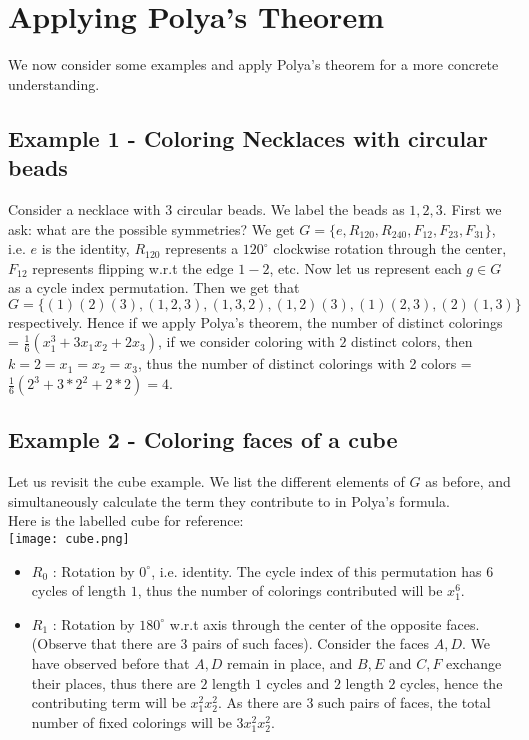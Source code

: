 {\section{Applying Polya's Theorem}
We now consider some examples and apply Polya's theorem for a more concrete understanding.
\subsection{Example 1 - Coloring Necklaces with circular beads}
Consider a necklace with $3$ circular beads. We label the beads as $1, 2, 3$. First we ask: what are the possible symmetries? We get $G = \{e, R_{120}, R_{240}, F_{12}, F_{23}, F_{31}\}$, i.e. $e$ is the identity, $R_{120}$ represents a $120^{\circ}$ clockwise rotation through the center, $F_{12}$ represents flipping w.r.t the edge $1-2$, etc. Now let us represent each $g \in G$ as a cycle index permutation. Then we get that $G = \{(1)(2)(3), (1, 2, 3), (1, 3, 2), (1, 2)(3), (1)(2, 3), (2)(1, 3)\}$ respectively. Hence if we apply Polya's theorem, the number of distinct colorings = $\frac{1}{6} (x_1^3 + 3x_1x_2 + 2x_3)$, if we consider coloring with $2$ distinct colors, then $k = 2 = x_1 = x_2 = x_3$, thus the number of distinct colorings with 2 colors = $\frac{1}{6} (2^3 + 3*2^2 + 2*2) = 4$.

\subsection{Example 2 - Coloring faces of a cube}
Let us revisit the cube example. We list the different elements of $G$ as before, and simultaneously calculate the term they contribute to in Polya's formula.
\\
Here is the labelled cube for reference:
\\
\texttt{[image: cube.png]}
\\
\begin{itemize}
\item $R_0$ : Rotation by $0^{\circ}$, i.e. identity. The cycle index of this permutation has $6$ cycles of length $1$, thus the number of colorings contributed will be $\boxed{x_1^6}$.

\item $R_1$ : Rotation by $180^{\circ}$ w.r.t axis through the center of the opposite faces. (Observe that there are $3$ pairs of such faces). Consider the faces $A, D$. We have observed before that $A, D$ remain in place, and $B, E$ and $C, F$ exchange their places, thus there are $2$ length $1$ cycles and $2$ length $2$ cycles, hence the contributing term will be $x_1^2x_2^2$. As there are $3$ such pairs of faces, the total number of fixed colorings will be $\boxed{3x_1^2x_2^2}$.


\end{itemize}}
